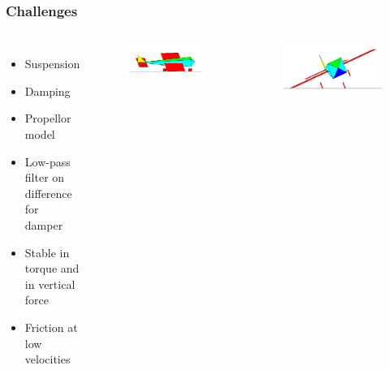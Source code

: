 \documentclass[10pt]{beamer}
\begin{document}
\begin{frame}
  \frametitle{Challenges}
  \begin{columns}[c]
    
    \begin{itemize}
    \item Suspension
    \item Damping 
    \item Propellor model 
    \item Low-pass filter on difference for damper
    \item Stable in torque and in vertical force
    \item Friction at low velocities
    \end{itemize}
    \begin{figure}[h]
      \includegraphics[width=\textwidth]{img/crash1.png}
    \end{figure}
    \begin{figure}[h]
      \includegraphics[width=\textwidth]{img/crash2.png}
    \end{figure}
  \end{columns}
\end{frame}
\end{document}
